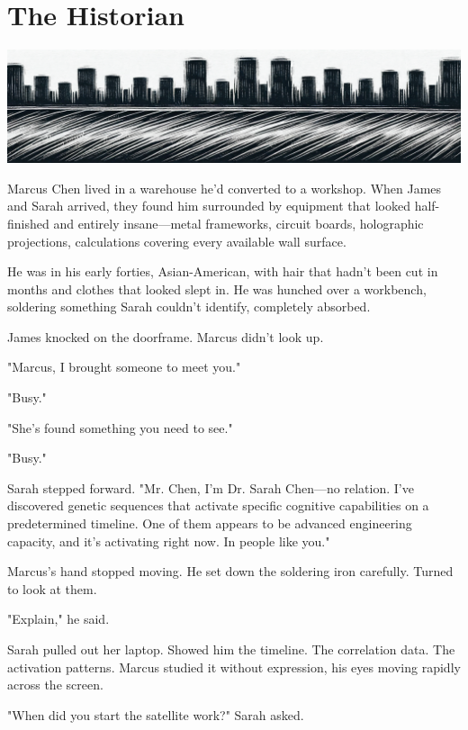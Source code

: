 \chapter{The Historian}
\label{ch:18}



\begin{center}
\includegraphics[width=\textwidth]{images/chapterImages/genesis_sketch_00105_.png}
\end{center}

Marcus Chen lived in a warehouse he'd converted to a workshop. When James and Sarah arrived, they found him surrounded by equipment that looked half-finished and entirely insane—metal frameworks, circuit boards, holographic projections, calculations covering every available wall surface.

He was in his early forties, Asian-American, with hair that hadn't been cut in months and clothes that looked slept in. He was hunched over a workbench, soldering something Sarah couldn't identify, completely absorbed.

James knocked on the doorframe. Marcus didn't look up.

"Marcus, I brought someone to meet you."

"Busy."

"She's found something you need to see."

"Busy."

Sarah stepped forward. "Mr. Chen, I'm Dr. Sarah Chen—no relation. I've discovered genetic sequences that activate specific cognitive capabilities on a predetermined timeline. One of them appears to be advanced engineering capacity, and it's activating right now. In people like you."

Marcus's hand stopped moving. He set down the soldering iron carefully. Turned to look at them.

"Explain," he said.

Sarah pulled out her laptop. Showed him the timeline. The correlation data. The activation patterns. Marcus studied it without expression, his eyes moving rapidly across the screen.

"When did you start the satellite work?" Sarah asked.

